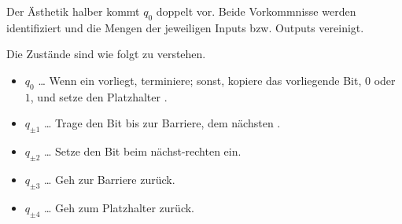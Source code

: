 \begin{solution}
{
}

Der Ästhetik halber kommt $q_0$ doppelt vor.
Beide Vorkommnisse werden identifiziert und die Mengen der jeweiligen Inputs bzw. Outputs vereinigt.

Die Zustände sind wie folgt zu verstehen.

\begin{itemize}
    
    \item $q_0$
    \dots
    Wenn ein \textvisiblespace vorliegt, terminiere;
    sonst, kopiere das vorliegende Bit, $0$ oder $1$, und setze den Platzhalter \textvisiblespace.

    \item $q_{\pm 1}$
    \dots
    Trage den Bit bis zur Barriere, dem nächsten \textvisiblespace.

    \item $q_{\pm 2}$
    \dots
    Setze den Bit beim nächst-rechten \textvisiblespace ein.

    \item $q_{\pm 3}$
    \dots
    Geh zur Barriere zurück.

    \item $q_{\pm 4}$
    \dots
    Geh zum Platzhalter zurück.

\end{itemize}

\end{solution}

